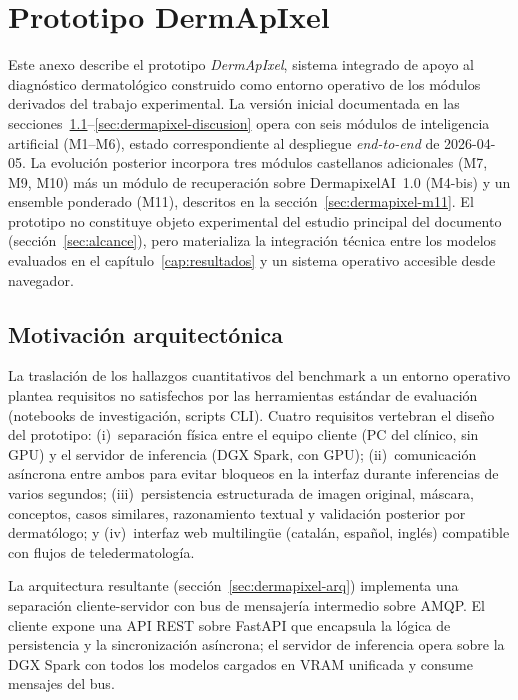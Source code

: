 
\chapter{Prototipo DermApIxel}
\label{cap:anexoh}

Este anexo describe el prototipo \emph{DermApIxel}, sistema
integrado de apoyo al diagnóstico dermatológico construido como
entorno operativo de los módulos derivados del trabajo
experimental. La versión inicial documentada en las
secciones~\ref{sec:dermapixel-motivacion}--\ref{sec:dermapixel-discusion}
opera con seis módulos de inteligencia artificial
(M1--M6), estado correspondiente al despliegue \emph{end-to-end}
de 2026-04-05. La evolución posterior incorpora tres módulos
castellanos adicionales (M7, M9, M10) más un módulo de
recuperación sobre DermapixelAI~1.0 (M4-bis) y un ensemble
ponderado (M11), descritos en la
sección~\ref{sec:dermapixel-m11}. El prototipo no constituye
objeto experimental del estudio principal del documento
(sección~\ref{sec:alcance}), pero materializa la integración
técnica entre los modelos evaluados en el
capítulo~\ref{cap:resultados} y un sistema operativo accesible
desde navegador.

\section{Motivación arquitectónica}
\label{sec:dermapixel-motivacion}

La traslación de los hallazgos cuantitativos del benchmark a un
entorno operativo plantea requisitos no satisfechos por las
herramientas estándar de evaluación (notebooks de investigación,
scripts CLI). Cuatro requisitos vertebran el diseño del prototipo:
(i)~separación física entre el equipo cliente (PC del clínico, sin
GPU) y el servidor de inferencia (DGX Spark, con GPU);
(ii)~comunicación asíncrona entre ambos para evitar bloqueos en la
interfaz durante inferencias de varios segundos; (iii)~persistencia
estructurada de imagen original, máscara, conceptos, casos
similares, razonamiento textual y validación posterior por
dermatólogo; y (iv)~interfaz web multilingüe (catalán, español,
inglés) compatible con flujos de teledermatología.

La arquitectura resultante (sección~\ref{sec:dermapixel-arq}) implementa
una separación cliente-servidor con bus de mensajería intermedio
sobre AMQP. El cliente expone una API REST sobre FastAPI que
encapsula la lógica de persistencia y la sincronización
asíncrona; el servidor de inferencia opera sobre la DGX Spark con
todos los modelos cargados en VRAM unificada y consume mensajes
del bus.

